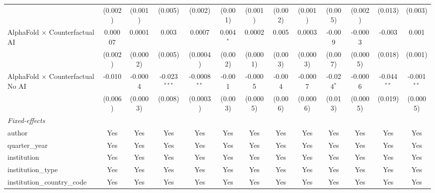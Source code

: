 \begin{tabular}{lcccccccccccc}
                                            & (0.002)       & (0.001)      & (0.005)        & (0.002)        & (0.001)     & (0.001)        & (0.002) & (0.001)       & (0.005)      & (0.002)  & (0.013)       & (0.003)\\   
   AlphaFold $\times$ Counterfactual AI     & 0.00007       & 0.0001       & 0.003          & 0.0007         & 0.004$^{*}$ & 0.0002         & 0.005   & 0.0003        & -0.009       & -0.0003  & -0.003        & 0.001\\   
                                            & (0.002)       & (0.0002)     & (0.005)        & (0.0004)       & (0.002)     & (0.0001)       & (0.003) & (0.0003)      & (0.007)      & (0.0005) & (0.018)       & (0.001)\\   
   AlphaFold $\times$ Counterfactual No AI  & -0.010        & -0.0004      & -0.023$^{***}$ & -0.0008$^{**}$ & -0.001      & -0.0005        & -0.004  & -0.0007       & -0.024$^{*}$ & -0.0006  & -0.044$^{**}$ & -0.001$^{**}$\\   
                                            & (0.006)       & (0.0003)     & (0.008)        & (0.0003)       & (0.003)     & (0.0005)       & (0.006) & (0.0006)      & (0.013)      & (0.0005) & (0.019)       & (0.0005)\\   
   \midrule
   \emph{Fixed-effects}\\
   author                                   & Yes           & Yes          & Yes            & Yes            & Yes         & Yes            & Yes     & Yes           & Yes          & Yes      & Yes           & Yes\\  
   quarter\_year                            & Yes           & Yes          & Yes            & Yes            & Yes         & Yes            & Yes     & Yes           & Yes          & Yes      & Yes           & Yes\\  
   institution                              & Yes           & Yes          & Yes            & Yes            & Yes         & Yes            & Yes     & Yes           & Yes          & Yes      & Yes           & Yes\\  
   institution\_type                        & Yes           & Yes          & Yes            & Yes            & Yes         & Yes            & Yes     & Yes           & Yes          & Yes      & Yes           & Yes\\  
   institution\_country\_code               & Yes           & Yes          & Yes            & Yes            & Yes         & Yes            & Yes     & Yes           & Yes          & Yes      & Yes           & Yes\\  

\end{tabular}
